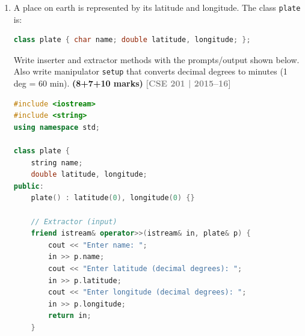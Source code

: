 \documentclass[12pt,a3paper]{article}
\newcommand{\yr}[1]{\hfill\textcolor{gray}{\small\textbf{[#1]}}}
\newcommand{\mk}[1]{\textcolor{orange!70!black}{\small\textbf{(#1 marks)}}}
\begin{document}
\begin{enumerate}
\begin{tcolorbox}
\begin{lstlisting}[language=C++]
#include <iostream>
#include <iomanip>
#include <cmath>
using namespace std;

// mystyle: right-justified, width 10, precision 5, hex integers, show + sign
ostream& mystyle(ostream& out) {
    out << right << setw(10) << setprecision(5) << fixed << showpos << hex;
    return out;
}

int main() {
    // Print header (optional, but good practice)
    cout << "         n      ln(n)\n";
    
    // Print 2 to 100 and corresponding natural log
    for(int i = 2; i <= 100; i++) {
        // mystyle is applied before EACH number because setw() is not sticky
        cout << mystyle << i << mystyle << log(i) << "\n";
    }
    
    return 0;
}
\end{lstlisting}
\end{tcolorbox}



\item A place on earth is represented by its latitude and longitude. The class \texttt{plate} is:
\begin{lstlisting}[language=C++]
class plate { char name; double latitude, longitude; };
\end{lstlisting}
Write inserter and extractor methods with the prompts/output shown below. Also write manipulator \texttt{setup} that converts decimal degrees to minutes (1 deg = 60 min). \mk{8+7+10}
\yr{CSE 201 | 2015--16}

\begin{tcolorbox}[enhanced,breakable,ansbox,
  colback=cA!4,colframe=cA,boxrule=0.8pt,arc=5pt,
  title={\textbf{Answer --- plate Class: Inserter, Extractor and setup Manipulator}},
  fonttitle=\bfseries\color{white},colbacktitle=cA]
\begin{lstlisting}[language=C++]
#include <iostream>
#include <string>
using namespace std;

class plate {
    string name;
    double latitude, longitude;
public:
    plate() : latitude(0), longitude(0) {}

    // Extractor (input)
    friend istream& operator>>(istream& in, plate& p) {
        cout << "Enter name: ";
        in >> p.name;
        cout << "Enter latitude (decimal degrees): ";
        in >> p.latitude;
        cout << "Enter longitude (decimal degrees): ";
        in >> p.longitude;
        return in;
    }


\end{lstlisting}
\end{tcolorbox}
\end{enumerate}
\end{document}
